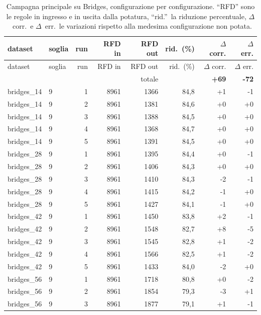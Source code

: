 \footnotesize
\begin{longtable}{@{}llrrrrrr@{}}
\caption{Campagna principale su Bridges, configurazione per configurazione. ``RFD'' sono le regole in ingresso e in uscita dalla potatura, ``rid.''\ la riduzione percentuale, $\Delta$~corr.\ e $\Delta$~err.\ le variazioni rispetto alla medesima configurazione non potata.}\label{tab:app-bridges}\\
\toprule
dataset & soglia & run & RFD in & RFD out & rid.\ (\si{\percent}) & $\Delta$ corr. & $\Delta$ err. \\
\midrule
\endfirsthead
\toprule
dataset & soglia & run & RFD in & RFD out & rid.\ (\si{\percent}) & $\Delta$ corr. & $\Delta$ err. \\
\midrule
\endhead
\midrule
\multicolumn{5}{r}{totale} & & \textbf{+69} & \textbf{-72} \\
\bottomrule
\endlastfoot
bridges\_14 & 9 & 1 & 8961 & 1366 & 84,8 & +1 & -1 \\
bridges\_14 & 9 & 2 & 8961 & 1381 & 84,6 & +0 & +0 \\
bridges\_14 & 9 & 3 & 8961 & 1388 & 84,5 & +0 & +0 \\
bridges\_14 & 9 & 4 & 8961 & 1368 & 84,7 & +0 & +0 \\
bridges\_14 & 9 & 5 & 8961 & 1391 & 84,5 & +0 & +0 \\
bridges\_28 & 9 & 1 & 8961 & 1395 & 84,4 & +0 & -1 \\
bridges\_28 & 9 & 2 & 8961 & 1406 & 84,3 & +0 & +0 \\
bridges\_28 & 9 & 3 & 8961 & 1410 & 84,3 & -2 & -1 \\
bridges\_28 & 9 & 4 & 8961 & 1415 & 84,2 & -1 & +0 \\
bridges\_28 & 9 & 5 & 8961 & 1427 & 84,1 & -1 & +0 \\
bridges\_42 & 9 & 1 & 8961 & 1450 & 83,8 & +2 & -1 \\
bridges\_42 & 9 & 2 & 8961 & 1548 & 82,7 & +8 & -5 \\
bridges\_42 & 9 & 3 & 8961 & 1545 & 82,8 & +1 & -2 \\
bridges\_42 & 9 & 4 & 8961 & 1566 & 82,5 & +1 & -2 \\
bridges\_42 & 9 & 5 & 8961 & 1433 & 84,0 & -2 & +0 \\
bridges\_56 & 9 & 1 & 8961 & 1718 & 80,8 & +0 & -2 \\
bridges\_56 & 9 & 2 & 8961 & 1854 & 79,3 & -3 & +1 \\
bridges\_56 & 9 & 3 & 8961 & 1877 & 79,1 & +1 & -1 \\

\end{longtable}
